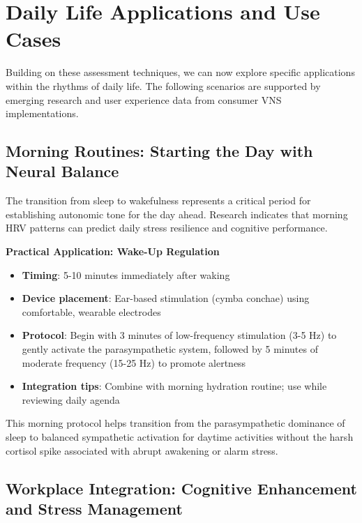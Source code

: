 \documentclass[
  Letterpaper,
]{scrbook}
\providecommand{\tightlist}{%
  \setlength{\itemsep}{0pt}\setlength{\parskip}{0pt}}\usepackage{longtable,booktabs,array}
\begin{document}
\section{Daily Life Applications and Use
Cases}\label{daily-life-applications-and-use-cases}

Building on these assessment techniques, we can now explore specific
applications within the rhythms of daily life. The following scenarios
are supported by emerging research and user experience data from
consumer VNS implementations.

\subsection{Morning Routines: Starting the Day with Neural
Balance}\label{morning-routines-starting-the-day-with-neural-balance}

The transition from sleep to wakefulness represents a critical period
for establishing autonomic tone for the day ahead. Research indicates
that morning HRV patterns can predict daily stress resilience and
cognitive performance.

\textbf{Practical Application: Wake-Up Regulation}

\begin{itemize}
\tightlist
\item
  \textbf{Timing}: 5-10 minutes immediately after waking
\item
  \textbf{Device placement}: Ear-based stimulation (cymba conchae) using
  comfortable, wearable electrodes
\item
  \textbf{Protocol}: Begin with 3 minutes of low-frequency stimulation
  (3-5 Hz) to gently activate the parasympathetic system, followed by 5
  minutes of moderate frequency (15-25 Hz) to promote alertness
\item
  \textbf{Integration tips}: Combine with morning hydration routine; use
  while reviewing daily agenda
\end{itemize}

This morning protocol helps transition from the parasympathetic
dominance of sleep to balanced sympathetic activation for daytime
activities without the harsh cortisol spike associated with abrupt
awakening or alarm stress.

\subsection{Workplace Integration: Cognitive Enhancement and Stress
Management}\label{workplace-integration-cognitive-enhancement-and-stress-management}
\end{document}
